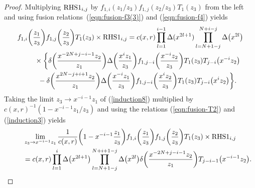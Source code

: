 \documentclass[pdftex]{sigma}
\numberwithin{equation}{section}
\begin{document}
\begin{proof}
{\sloppy Multiplying ${\rm RHS1}_{i,j}$ by $f_{1,i}(z_1/z_3)f_{1,j}(z_2/z_3)T_1(z_3)$ from the left and using fusion re\-la\-tions~(\ref{eqn:fusion-f3(3)}) and (\ref{eqn:fusion-f4}) yields
\begin{gather}
f_{1,i}\bigg(\frac{z_1}{z_3}\bigg)f_{1,j}\bigg(\frac{z_2}{z_3}\bigg)T_1(z_3)
\times {\rm RHS1}_{i, j}=
c(x,r)\prod_{l=1}^{i-1}\Delta(x^{2l+1})\prod_{l=N+1-j}^{N+i-j}\Delta\big(x^{2l}\big)\notag
\\ \qquad
{}\times
\bigg\{\delta\bigg(\frac{x^{-2N+j-i-1}z_2}{z_1}\bigg)
\Delta\bigg(\frac{x^i z_1}{z_3}\bigg)f_{1,j-i}\bigg(\frac{x^{-i}z_2}{z_3}\bigg) T_1(z_3)T_{j-i}\big(x^{-i}z_2\big)\notag
\\ \qquad
{}-\delta\bigg(\frac{x^{2N-j+i+1}z_2}{z_1}\bigg)
\Delta\bigg(\frac{x^{-i} z_1}{z_3}\bigg)
f_{1,j-i}\bigg(\frac{x^{i}z_2}{z_3}\bigg)T_1(z_3)T_{j-i}\big(x^{i}z_2\big)\bigg\}.
\label{induction8}
\end{gather}}%
Taking the limit $z_3\to x^{-i-1}z_1$ of (\ref{induction8}) multiplied by $c(x,r)^{-1} (1-x^{-i-1}z_1/z_3)$ and using the relations
(\ref{eqn:fusion-T2}) and (\ref{induction3}) yields
\begin{gather}
\lim_{z_3 \to x^{-i-1}z_1}\frac{1}{c(x,r)}\bigg(1-x^{-i-1}\frac{z_1}{z_3}\bigg)
f_{1,i}\bigg(\frac{z_1}{z_3}\bigg)
f_{1,j}\bigg(\frac{z_2}{z_3}\bigg)T_1(z_3)\times {\rm RHS1}_{i, j}\notag
\\ \qquad
{}=c(x,r)\prod_{l=1}^i \Delta\big(x^{2l+1}\big)
\prod_{l=N+1-j}^{N+i+1-j}\Delta\big(x^{2l}\big)
\delta\bigg(\frac{x^{-2N+j-i-1}z_2}{z_1}\bigg)T_{j-i-1}\big(x^{-i-1}z_2\big).
\label{induction9}
\end{gather}


\end{proof}
\end{document}
